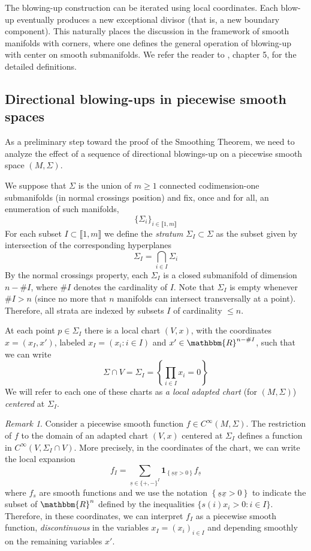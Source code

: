 \documentclass[11pt,psamsfonts]{article}
\newcommand{\tmem}[1]{{\em #1\/}}
\newcommand{\tmmathbf}[1]{\ensuremath{\boldsymbol{#1}}}
\theoremstyle{definition}
\theoremstyle{remark}
\newtheorem{Remark}[Theorem]{Remark}
\newcommand{\cR}{\ensuremath{\mathbbm{R}}}
\begin{document}
The blowing-up construction can be iterated using local coordinates. Each blow-up eventually produces a new exceptional divisor (that is, a new boundary component). This naturally places the discussion in the framework of smooth manifolds with corners, where one defines the general operation of blowing-up with center on smooth submanifolds. We refer the reader to \cite{Melrose}, chapter 5, for
the detailed definitions.
\subsection{Directional blowing-ups in piecewise smooth spaces}\label{subsect-local-situation-I}
As a preliminary step toward the proof of the Smoothing Theorem, we need to analyze the effect of a sequence of directional blowings-up on a piecewise smooth space $(M, \Sigma)$.

We suppose that $\Sigma$ is the
union of $m \geqslant 1$ connected codimension-one submanifolds (in normal
crossings position) and fix, once and for all, an enumeration of such
manifolds,
\[ \{ \Sigma_i \}_{i \in \llbracket 1, m \rrbracket} \]
For each subset $I \subset \llbracket 1, m \rrbracket$ we define the
{\tmem{stratum}} $\Sigma_I \subset \Sigma$ as the subset given by intersection of the corresponding hyperplanes
\[ \Sigma_I = \bigcap_{i \in I} \Sigma_i \]
By the normal crossings property, each $\Sigma_I$ is a closed submanifold of
dimension $n -\#I$, where $\#I$ denotes the cardinality of $I$. Note that
$\Sigma_I$ is empty whenever $\#I > n$ (since no more that $n$ manifolds can
intersect transversally at a point). Therefore, all strata are indexed by
subsets $I$ of cardinality $\leqslant n$.

At each point $p \in \Sigma_I$ there is a local chart $(V, x)$, with the
coordinates $x = (x_I, x')$, labeled $x_I = (x_i : i \in I)$ and $x' \in
\cR^{n -\#I}$, such that we can write
\[ \Sigma \cap V = \Sigma_I  = \left\{ \prod_{i \in I} x_i = 0 \right\}
\]
We will refer to each one of these charts as {\tmem{a local adapted chart}}
(for $(M, \Sigma)$) {\tmem{centered}} at $\Sigma_I$.

\begin{Remark}
  Consider a piecewise smooth function $f \in C^{\infty} (M, \Sigma)$. The
  restriction of $f$ to the domain of an adapted chart $(V, x)$ centered at
  $\Sigma_I$ defines a function in $C^{\infty} (V, \Sigma_I \cap V)$. More
  precisely, in the coordinates of the chart, we can write the local expansion
  \begin{equation}
    f_I = \sum_{\underline{s} \in \{ +, - \}^I} \tmmathbf{1}_{\left\{
    \underline{s}  \underline{x} > 0 \right\}} f_{\underline{s}}
    \label{definition-fI}
  \end{equation}
  where $f_s$ are smooth functions and we use the notation $\left\{
  \underline{s}  \underline{x} > 0 \right\}$ to indicate the subset of
  $\cR^n$ defined by the inequalities $\{ s (i) x_i > 0 : i \in I \} .$
  Therefore, in these coordinates, we can interpret $f_I$ as a piecewise
  smooth function, {\tmem{discontinuous}} in the variables $x_I = (x_i)_{i \in
  I}$ and depending smoothly on the remaining variables $x'$. 
\end{Remark}
\end{document}
